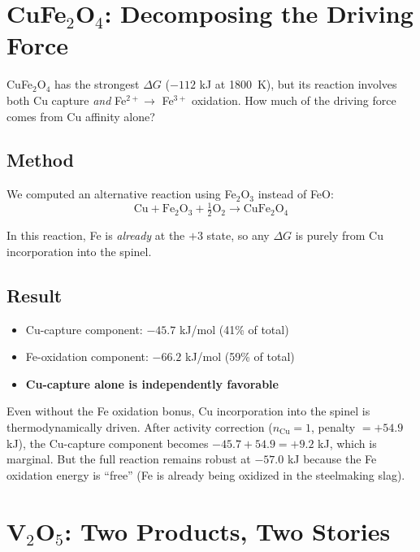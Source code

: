 \documentclass[11pt]{article}
\begin{document}
\section{CuFe$_2$O$_4$: Decomposing the Driving Force}

CuFe$_2$O$_4$ has the strongest $\Delta G$ ($-112$ kJ at \SI{1800}{\kelvin}), but its reaction involves both Cu capture \textit{and} Fe$^{2+} \to$ Fe$^{3+}$ oxidation. How much of the driving force comes from Cu affinity alone?

\subsection{Method}

We computed an alternative reaction using Fe$_2$O$_3$ instead of FeO:
\[
    \text{Cu} + \text{Fe}_2\text{O}_3 + \tfrac{1}{2}\text{O}_2 \to \text{CuFe}_2\text{O}_4
\]

In this reaction, Fe is \textit{already} at the $+3$ state, so any $\Delta G$ is purely from Cu incorporation into the spinel.

\subsection{Result}

\begin{itemize}[leftmargin=*]
    \item Cu-capture component: $-45.7$ kJ/mol (41\% of total)
    \item Fe-oxidation component: $-66.2$ kJ/mol (59\% of total)
    \item \textbf{Cu-capture alone is independently favorable}
\end{itemize}

Even without the Fe oxidation bonus, Cu incorporation into the spinel is thermodynamically driven. After activity correction ($n_{\text{Cu}} = 1$, penalty $= +54.9$ kJ), the Cu-capture component becomes $-45.7 + 54.9 = +9.2$ kJ, which is marginal. But the full reaction remains robust at $-57.0$ kJ because the Fe oxidation energy is ``free'' (Fe is already being oxidized in the steelmaking slag).


\section{V$_2$O$_5$: Two Products, Two Stories}
\end{document}
